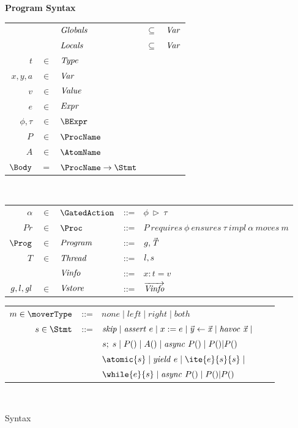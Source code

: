 \begin{figure}
\setlength{\tabcolsep}{3pt}
{\bf Program Syntax} \\
\begin{tabular}{rclcl}
&& $\mathit{Globals}$ & $\subseteq$ &$\mathit{Var}$ \\
&& $\mathit{Locals}$ & $\subseteq$ & $\mathit{Var}$ \\
$t$ & $\in$ & $\mathit{Type}$ \\
$x,y,a$ & $\in$ & $\mathit{Var}$ \\
$v$ &  $\in$ & $\mathit{Value}$ \\
$e$ & $\in$ & $\mathit{Expr}$ \\
$\phi,\tau$ & $\in$ & $\BExpr$ \\
$P$ & $\in$ & $\ProcName$ \\
$A$ & $\in$ & $\AtomName$ \\
$\Body$ & = & $\ProcName \rightarrow \Stmt$ \\
\end{tabular}\\
\begin{tabular}{rclcl}
$\alpha$ & $\in$ & $\GatedAction$ & ::= & $\phi\ \rhd\ \tau$ \\
$Pr$ & $\in$ & $\Proc$ &::= & $P\ \mathit{requires}\ \phi\
\mathit{ensures}\ \tau\ \mathit{impl}\ \alpha\ \mathit{moves}\ m$ \\
$\Prog$ & $\in$ & $\mathit{Program}$ & ::= & $g, \vec{\mathit{T}}$ \\
$T$ & $\in$ & $\mathit{Thread}$ & ::=  & $l, s$ \\
&&$\mathit{Vinfo}$ & ::= & $x:t=v$ \\
$g,l,\mathit{gl}$ & $\in$ & $\mathit{Vstore}$ & ::= & $\overrightarrow{\mathit{Vinfo}}$ \\
\end{tabular}
\begin{tabular}{rclcl}
$m \in \moverType$ &::= &$\mathit{none} \mid \mathit{left} \mid \mathit{right} \mid \mathit{both}$ \\
$s \in \Stmt$ &::= & $\mathit{skip} \mid \mathit{assert}\ e \mid x := e \mid \vec{\mathit{y}} \leftarrow \vec{\mathit{x}} \mid \mathit{havoc}\ \vec{\mathit{x}} \mid$ \\
                  & & $s;\;s \mid P() \mid A() \mid \mathit{async}\ P() \mid P() | P()$ \\
                  & & $\atomic{s} \mid \yield{e} \mid \ite{e}{s}{s} \mid$ \\ 
                  & & $\while{e}{s} \mid \async{P()} \mid \parcall{P()}{P()}$ \\
\end{tabular}
\\
\setlength{\tabcolsep}{6pt}
\caption{Syntax}
\label{fig:syntax}
\end{figure}

